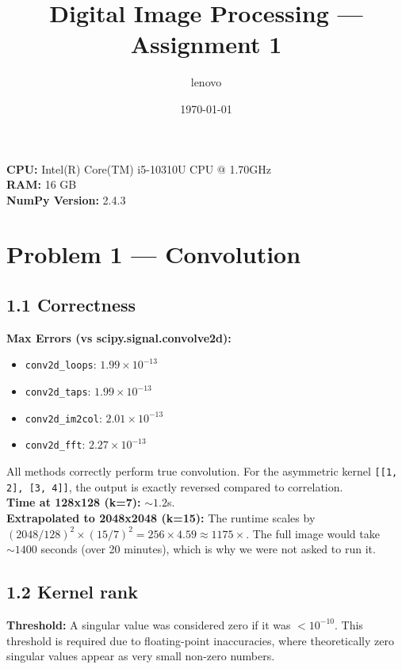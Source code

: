 \documentclass[a4paper,11pt]{article}
\title{Digital Image Processing --- Assignment 1}
\author{lenovo}
\date{\today}
\begin{document}
\maketitle

\noindent
\textbf{CPU:} Intel(R) Core(TM) i5-10310U CPU @ 1.70GHz \\
\textbf{RAM:} 16 GB \\
\textbf{NumPy Version:} 2.4.3

\section*{Problem 1 --- Convolution}

\subsection*{1.1 Correctness}
\textbf{Max Errors (vs scipy.signal.convolve2d):}
\begin{itemize}
    \item \texttt{conv2d\_loops}: $1.99 \times 10^{-13}$
    \item \texttt{conv2d\_taps}: $1.99 \times 10^{-13}$
    \item \texttt{conv2d\_im2col}: $2.01 \times 10^{-13}$
    \item \texttt{conv2d\_fft}: $2.27 \times 10^{-13}$
\end{itemize}
All methods correctly perform true convolution. For the asymmetric kernel \texttt{[[1, 2], [3, 4]]}, the output is exactly reversed compared to correlation. \\
\textbf{Time at 128x128 (k=7):} $\sim 1.2$s. \\
\textbf{Extrapolated to 2048x2048 (k=15):} The runtime scales by $(2048/128)^2 \times (15/7)^2 = 256 \times 4.59 \approx 1175\times$. The full image would take $\sim 1400$ seconds (over 20 minutes), which is why we were not asked to run it.

\subsection*{1.2 Kernel rank}
\textbf{Threshold:} A singular value was considered zero if it was $< 10^{-10}$. This threshold is required due to floating-point inaccuracies, where theoretically zero singular values appear as very small non-zero numbers.
\end{document}
